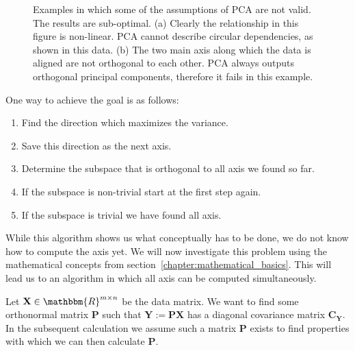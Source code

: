 \begin{figure}
	\centering
	\begin{subfigure}{0.45\linewidth}
		
		\caption{}
		\label{fig:pca_fails_nonlinear}
	\end{subfigure}
	\hfill
	\begin{subfigure}{0.45\linewidth}
		
		\caption{}
		\label{fig:pca_fails_nonorthogonal}
	\end{subfigure}
	
	\caption{Examples in which some of the assumptions of PCA are not valid. The results are sub-optimal. \newline (a) Clearly the relationship in this figure is non-linear. PCA cannot describe circular dependencies, as shown in this data. \newline (b) The two main axis along which the data is aligned are not orthogonal to each other. PCA always outputs orthogonal principal components, therefore it fails in this example.}
	\label{fig:pca_fails}
\end{figure}

One way to achieve the goal is as follows:
\begin{enumerate}
	\item Find the direction which maximizes the variance.
	\item Save this direction as the next axis.
	\item Determine the subspace that is orthogonal to all axis we found so far.
	\item If the subspace is non-trivial start at the first step again.
	\item If the subspace is trivial we have found all axis.
\end{enumerate}

While this algorithm shows us what conceptually has to be done, we do not know how to compute the axis yet. We will now investigate this problem using the mathematical concepts from section~\ref{chapter:mathematical_basics}. This will lead us to an algorithm in which all axis can be computed simultaneously.

Let $\mathbf{X} \in \mathbbm{R}^{m\times n}$ be the data matrix. We want to find some orthonormal matrix $\mathbf{P}$ such that $\mathbf{Y}:=\mathbf{PX}$ has a diagonal covariance matrix $\mathbf{C}_{\mathbf{Y}}$. \color{change} In the subsequent calculation we assume such a matrix $\mathbf{P}$ exists to find properties with which we can then calculate $\mathbf{P}$. \color{black}

